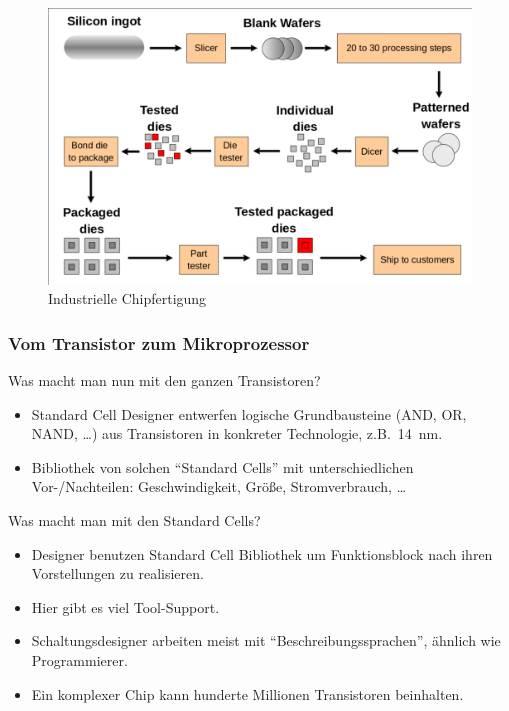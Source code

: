 \begin{frame}
	\begin{figure}
		\centering
		\includegraphics[width=.8\textwidth]{images/chip_fertigung.png}
		\vspace{0.3cm}
		\caption{Industrielle Chipfertigung}
	\end{figure}

\end{frame}


\begin{frame}
	\frametitle{Vom Transistor zum Mikroprozessor}
	\begin{block}{Was macht man nun mit den ganzen Transistoren?}
		\begin{itemize}
			\item Standard Cell Designer entwerfen logische Grundbausteine
				(AND, OR, NAND, \ldots) aus Transistoren in konkreter
				Technologie, z.B.\ \SI{14}{\nano\meter}.
			\item Bibliothek von solchen ``Standard Cells'' mit
				unterschiedlichen Vor-/Nachteilen: Geschwindigkeit, Größe,
				Stromverbrauch, \ldots
		\end{itemize}
	\end{block}
\end{frame}

\begin{frame}
	\begin{block}{Was macht man mit den Standard Cells?}
		\begin{itemize}
			\item Designer benutzen Standard Cell Bibliothek um Funktionsblock
				nach ihren Vorstellungen zu realisieren.
			\item Hier gibt es viel Tool-Support.
			\item Schaltungsdesigner arbeiten meist mit ``Beschreibungssprachen'',
                              ähnlich wie Programmierer.
			\item Ein komplexer Chip kann hunderte Millionen Transistoren
				beinhalten.
		\end{itemize}
	\end{block}
\end{frame}

